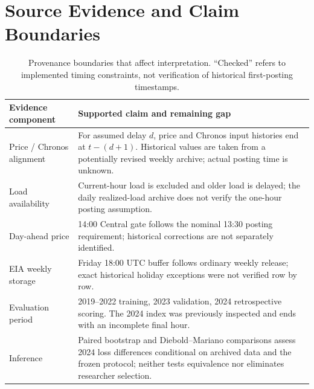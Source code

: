 \documentclass[11pt,letterpaper]{article}
\begin{document}
\section{Source Evidence and Claim Boundaries}\label{app:evidence}
\begin{table}[h]
\centering\small
\caption{Provenance boundaries that affect interpretation. ``Checked'' refers to implemented timing constraints, not verification of historical first-posting timestamps.}\label{tab:limitations}
\begin{tabularx}{\linewidth}{@{}p{2.95cm}X@{}}
\toprule
Evidence component & Supported claim and remaining gap\\
\midrule
Price / Chronos alignment & For assumed delay $d$, price and Chronos input histories end at $t-(d+1)$. Historical values are taken from a potentially revised weekly archive; actual posting time is unknown.\\
Load availability & Current-hour load is excluded and older load is delayed; the daily realized-load archive does not verify the one-hour posting assumption.\\
Day-ahead price & 14:00 Central gate follows the nominal 13:30 posting requirement; historical corrections are not separately identified.\\
EIA weekly storage & Friday 18:00 UTC buffer follows ordinary weekly release; exact historical holiday exceptions were not verified row by row.\\
Evaluation period & 2019--2022 training, 2023 validation, 2024 retrospective scoring. The 2024 index was previously inspected and ends with an incomplete final hour.\\
Inference & Paired bootstrap and Diebold--Mariano comparisons assess 2024 loss differences conditional on archived data and the frozen protocol; neither tests equivalence nor eliminates researcher selection.\\
\bottomrule
\end{tabularx}
\end{table}
\end{document}
